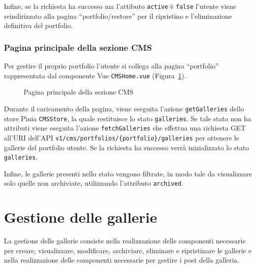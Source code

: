 Infine, se la richiesta ha successo ma l'attibuto \verb|active| \`e \verb|false| l'utente viene reindirizzato alla pagina ``portfolio/restore'' per il ripristino e l'eliminazione definitiva del portfolio.


\subsubsection{Pagina principale della sezione CMS}
Per gestire il proprio portfolio l'utente si collega alla pagina ``portfolio'' rappresentata dal componente Vue \verb|CMSHome.vue| (Figura~\ref{fig:cms-home}).
\begin{figure}[htbp]
	\centering
	\fboxsep=0.5pt
	\fboxrule=0.5pt
	\caption{Pagina principale della sezione CMS}
	\label{fig:cms-home}
\end{figure}

Durante il caricamento della pagina, viene eseguita l'azione \verb|getGalleries| dello store Pinia \verb|CMSStore|, la quale restituisce lo stato \verb|galleries|. Se tale stato non ha attributi viene eseguita l'azione \verb|fetchGalleries| che effettua una richiesta GET all'URI dell'API \verb|v1/cms/portfolios/{portfolio}/galleries| per ottenere le gallerie del portfolio utente. Se la richiesta ha successo verr\`a inizializzato lo stato \verb|galleries|. 

Infine, le gallerie presenti nello stato vengono filtrate, in modo tale da visualizzare solo quelle non archiviate, utilizzando l'attributo \verb|archived|.

\section{Gestione delle gallerie}
La gestione delle gallerie consiste nella realizzazione delle componenti necessarie per creare, visualizzare, modificare, archiviare, eliminare e ripristinare le gallerie e nella realizzazione delle componenti necessarie per gestire i post della galleria. 

